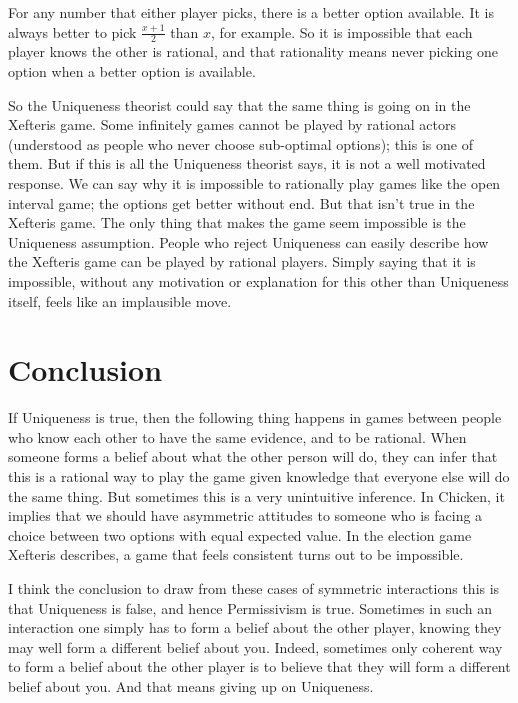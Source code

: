 \documentclass[
  11pt,
]{article}
\begin{document}
For any number that either player picks, there is a better option available. It is always better to pick \(\frac{x+1}{2}\) than \(x\), for example. So it is impossible that each player knows the other is rational, and that rationality means never picking one option when a better option is available.

So the Uniqueness theorist could say that the same thing is going on in the Xefteris game. Some infinitely games cannot be played by rational actors (understood as people who never choose sub-optimal options); this is one of them. But if this is all the Uniqueness theorist says, it is not a well motivated response. We can say why it is impossible to rationally play games like the open interval game; the options get better without end. But that isn't true in the Xefteris game. The only thing that makes the game seem impossible is the Uniqueness assumption. People who reject Uniqueness can easily describe how the Xefteris game can be played by rational players. Simply saying that it is impossible, without any motivation or explanation for this other than Uniqueness itself, feels like an implausible move.

\hypertarget{conclusion}{%
\section{Conclusion}\label{conclusion}}

If Uniqueness is true, then the following thing happens in games between people who know each other to have the same evidence, and to be rational. When someone forms a belief about what the other person will do, they can infer that this is a rational way to play the game given knowledge that everyone else will do the same thing. But sometimes this is a very unintuitive inference. In Chicken, it implies that we should have asymmetric attitudes to someone who is facing a choice between two options with equal expected value. In the election game Xefteris describes, a game that feels consistent turns out to be impossible.

I think the conclusion to draw from these cases of symmetric interactions this is that Uniqueness is false, and hence Permissivism is true. Sometimes in such an interaction one simply has to form a belief about the other player, knowing they may well form a different belief about you. Indeed, sometimes only coherent way to form a belief about the other player is to believe that they will form a different belief about you. And that means giving up on Uniqueness.
\end{document}
